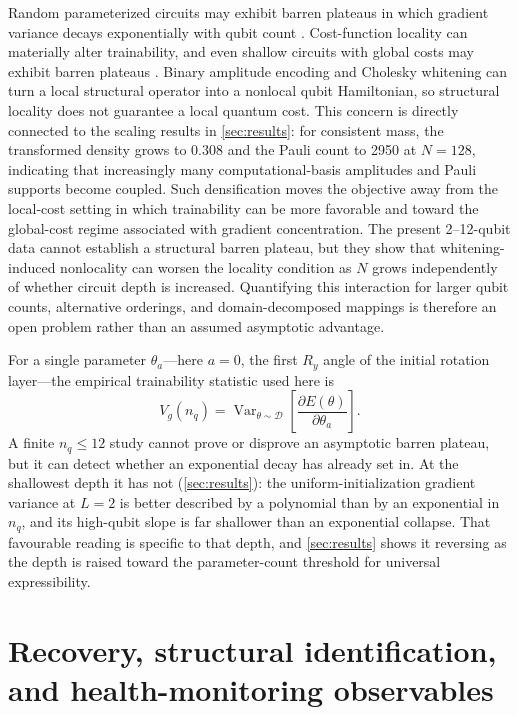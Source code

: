 \documentclass{ieeeaccess}
\newcommand{\Var}{\operatorname{Var}}
\begin{document}
Random parameterized circuits may exhibit barren plateaus in which gradient variance decays exponentially with qubit count \cite{McClean2018}. Cost-function locality can materially alter trainability, and even shallow circuits with global costs may exhibit barren plateaus \cite{CerezoBP2021}. Binary amplitude encoding and Cholesky whitening can turn a local structural operator into a nonlocal qubit Hamiltonian, so structural locality does not guarantee a local quantum cost. This concern is directly connected to the scaling results in \cref{sec:results}: for consistent mass, the transformed density grows to 0.308 and the Pauli count to 2950 at $N=128$, indicating that increasingly many computational-basis amplitudes and Pauli supports become coupled. Such densification moves the objective away from the local-cost setting in which trainability can be more favorable and toward the global-cost regime associated with gradient concentration. The present 2--12-qubit data cannot establish a structural barren plateau, but they show that whitening-induced nonlocality can worsen the locality condition as $N$ grows independently of whether circuit depth is increased. Quantifying this interaction for larger qubit counts, alternative orderings, and domain-decomposed mappings is therefore an open problem rather than an assumed asymptotic advantage.

For a single parameter $\theta_a$---here $a=0$, the first $R_y$ angle of the initial rotation layer---the empirical trainability statistic used here is
\begin{equation}
V_g(n_q)=\Var_{\theta\sim\mathcal D}
\left[\frac{\partial E(\theta)}{\partial\theta_a}\right].
\label{eq:gradvar}
\end{equation}
A finite $n_q\le12$ study cannot prove or disprove an asymptotic barren plateau, but it can detect whether an exponential decay has already set in. At the shallowest depth it has not (\cref{sec:results}): the uniform-initialization gradient variance at $L=2$ is better described by a polynomial than by an exponential in $n_q$, and its high-qubit slope is far shallower than an exponential collapse. That favourable reading is specific to that depth, and \cref{sec:results} shows it reversing as the depth is raised toward the parameter-count threshold for universal expressibility.

\section{Recovery, structural identification, and health-monitoring observables}
\label{sec:observables}
\end{document}
